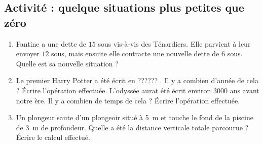 
\subsection*{Activité : quelque situations plus petites que zéro}

\begin{enumerate}
    \item
        Fantine a une dette de \( 15\) sous vis-à-vis des Ténardiers. Elle parvient à leur envoyer \( 12\) sous, mais ensuite elle contracte une nouvelle dette de \( 6\) sous. Quelle est sa nouvelle situation ?
    \item
        Le premier Harry Potter a été écrit en ?????? . Il y a combien d'année de cela ? Écrire l'opération effectuée. L'odyssée aurat été écrit environ \( 3000\) ans avant notre ère. Il y a combien de temps de cela ? Écrire l'opération effectuée.
    \item
        Un plongeur saute d'un plongeoir situé à \SI{5}{\meter} et touche le fond de la piscine de \SI{3}{\meter} de profondeur. Quelle a été la distance verticale totale parcourue ? Écrire le calcul effectué.

\end{enumerate}

